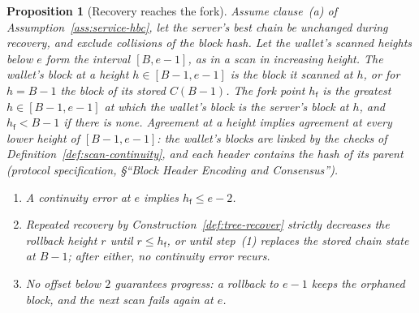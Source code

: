 \documentclass[11pt,a4paper]{article}
\newtheorem{proposition}[theorem]{Proposition}
\theoremstyle{definition}
\begin{document}
\begin{proposition}[Recovery reaches the fork]\label{prop:tree-fork}
Assume clause~(a) of Assumption~\ref{ass:service-hbc}, let the server's
best chain be unchanged during recovery, and exclude collisions of the block
hash. Let the wallet's scanned heights below $e$ form the interval
$[B, e - 1]$, as in a scan in increasing height. The wallet's block at a
height $h \in [B - 1, e - 1]$ is the block it scanned at $h$, or for
$h = B - 1$ the block of its stored $C(B - 1)$. The \emph{fork point}
$h_{\mathsf{f}}$ is the greatest $h \in [B - 1, e - 1]$ at which the
wallet's block is the server's block at $h$, and $h_{\mathsf{f}} < B - 1$
if there is none. Agreement at a height implies agreement at every lower
height of $[B - 1, e - 1]$: the wallet's blocks are linked by the checks of
Definition~\ref{def:scan-continuity}, and each header contains the hash of
its parent (protocol specification, \S``Block Header Encoding and
Consensus'').
\begin{enumerate}[label=(\roman*)]
\item A continuity error at $e$ implies $h_{\mathsf{f}} \le e - 2$.
\item Repeated recovery by Construction~\ref{def:tree-recover} strictly
  decreases the rollback height $r$ until $r \le h_{\mathsf{f}}$, or until
  step~(1) replaces the stored chain state at $B - 1$; after either, no
  continuity error recurs.
\item No offset below $2$ guarantees progress: a rollback to $e - 1$ keeps
  the orphaned block, and the next scan fails again at $e$.
\end{enumerate}
\end{proposition}
\end{document}
